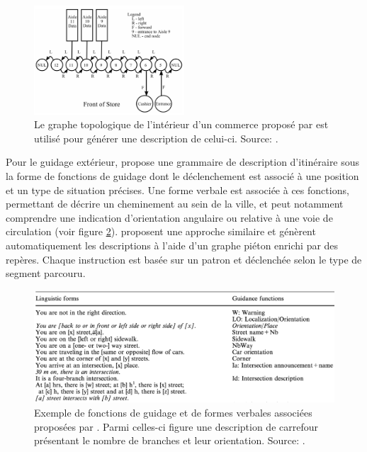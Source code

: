 \begin{figure}[ht]
    \centering
    \includegraphics[width=0.5\textwidth]{images/etat_art/kulyukin_graph.png}
    \caption[Graphe topologique de l'intérieur d'un commerce]{Le graphe topologique de l'intérieur d'un commerce proposé par \citet{Kulyukin2008} est utilisé pour générer une description de celui-ci. Source: \citep{Kulyukin2008}.}
    \label{fig:ea_kulyukin_graph}
\end{figure}

\newpar{}

Pour le guidage extérieur, \citet{gaunet_verbal_2006} propose une grammaire de description d'itinéraire sous la forme de fonctions de guidage dont le déclenchement est associé à une position et un type de situation précises. Une forme verbale est associée à ces fonctions, permettant de décrire un cheminement au sein de la ville, et peut notamment comprendre une indication d’orientation angulaire ou relative à une voie de circulation (voir figure \ref{fig:ea_ex_desc_gaunet}). \citet{Balata2016} proposent une approche similaire et génèrent automatiquement les descriptions à l'aide d'un graphe piéton enrichi par des repères. Chaque instruction est basée sur un patron et déclenchée selon le type de segment parcouru.

\begin{figure}[ht]
    \centering
    \includegraphics[width=\textwidth]{images/etat_art/exemple_itineraire_gaunet.png}
    \caption[Exemple de description issu de la littérature]{Exemple de fonctions de guidage et de formes verbales associées proposées par \citet{gaunet_verbal_2006}. Parmi celles-ci figure une description de carrefour présentant le nombre de branches et leur orientation. Source: \citep{gaunet_verbal_2006}.}
    \label{fig:ea_ex_desc_gaunet}
\end{figure}


